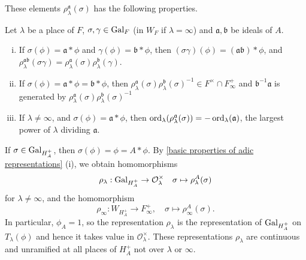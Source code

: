 \documentclass{article}
\renewcommand{\O}{\mathcal{O}}
\begin{document}
These elements $\rho_\lambda^\mathfrak{a}(\sigma)$ has the following properties.

\begin{lemma}\label{basic properties of adic representations}
    Let $\lambda$ be a place of $F$, $\sigma, \gamma\in\operatorname{Gal}_F$ (in $W_F$ if $\lambda = \infty$) and $\mathfrak{a}, \mathfrak{b}$ be ideals of $A$.
    \begin{enumerate}[(i)]
        \item If $\sigma(\phi) = \mathfrak{a}*\phi$ and $\gamma(\phi) = \mathfrak{b}*\phi$,
        then $(\sigma\gamma)(\phi) = (\mathfrak{a}\mathfrak{b}) * \phi$, and $\rho_{\lambda}^{\mathfrak{ab}}(\sigma\gamma) = \rho_\lambda^\mathfrak{a}(\sigma)\rho_\lambda^\mathfrak{b}(\gamma)$.
        \item If $\sigma(\phi) = \mathfrak{a}*\phi = \mathfrak{b}*\phi$,
        then $\rho_\lambda^\mathfrak{a}(\sigma)\rho_\lambda^\mathfrak{b}(\sigma)^{-1}\in F^\times\cap F_\infty^+$ and $\mathfrak{b}^{-1}\mathfrak{a}$ is generated by $\rho_\lambda^\mathfrak{a}(\sigma)\rho_\lambda^\mathfrak{b}(\sigma)^{-1}$
        \item  If $\lambda\ne\infty$, and $\sigma(\phi) = \mathfrak{a} * \phi$,
        then $\operatorname{ord}_\lambda(\rho_\lambda^\mathfrak{a}(\sigma)) = -\operatorname{ord}_\lambda(\mathfrak{a})$, the largest power of $\lambda$ dividing $\mathfrak{a}$.
    \end{enumerate}
\end{lemma}

If $\sigma\in\operatorname{Gal}_{H_A^+}$,
then $\sigma(\phi) = \phi = A * \phi$.
By \cref{basic properties of adic representations} (i),
we obtain homomorphisms
\[\rho_\lambda : \gal_{H_A^+}\to \O_\lambda^\times\quad \sigma\mapsto \rho_\lambda^A(\sigma)\]
for $\lambda\ne\infty$, and the homomorphism
\[\rho_\infty : W_{H_A^+}\to F_\infty^+,\quad \sigma\mapsto \rho_\infty^A(\sigma).\]
In particular, $\phi_A = 1$, so the representation $\rho_\lambda$ is the representation of $\operatorname{Gal}_{H_A^+}$ on $T_\lambda(\phi)$ and hence it takes value in $\O_\lambda^\times$.
These representations $\rho_\lambda$ are continuous and unramified at all places of $H_A^+$ not over $\lambda$ or $\infty$.

\end{document}
